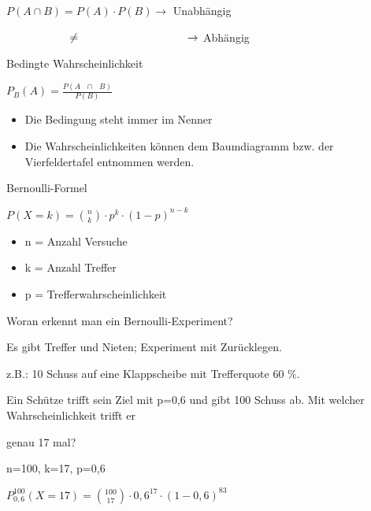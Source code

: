 \documentclass[paper=a6,landscape,ngerman,twoside=true,fontsize=12pt]{scrartcl}
\begin{document}
\begin{antwort}
	$P(A\cap B)=P(A)\cdot P(B) \rightarrow$ Unabhängig
	
	
	$\hspace{2cm}\neq \hspace{3.5cm}    \rightarrow$ Abhängig
\end{antwort}
\begin{frage}
	Bedingte Wahrscheinlichkeit
	
\end{frage}
\begin{antwort}
	\LARGE
	$P_B(A)=\frac{P(A \text{ }\cap \text{ }B)}{P(B)}$
	\large
	\begin{itemize}
		\item Die Bedingung steht immer im Nenner
		\item Die Wahrscheinlichkeiten können dem Baumdiagramm bzw. der Vierfeldertafel
		entnommen werden.
	\end{itemize}
	
	
\end{antwort}
\begin{frage}
	Bernoulli-Formel
	
\end{frage}
\begin{antwort}
	\LARGE
	$P(X=k)=\binom{n}{k} \cdot p^k \cdot (1-p)^{n-k}$
	\large
	\begin{itemize}
		\item n = Anzahl Versuche
		\item k = Anzahl Treffer
		\item p = Trefferwahrscheinlichkeit
	\end{itemize}	
\end{antwort}
\begin{frage}
	Woran erkennt man ein Bernoulli-Experiment?
	
\end{frage}
\begin{antwort}
	Es gibt Treffer und Nieten; Experiment mit Zurücklegen.
	
	z.B.: 10 Schuss auf eine Klappscheibe mit Trefferquote 60 $\%$.
\end{antwort}
\begin{frage}
	\large
	Ein Schütze trifft sein Ziel mit p=0,6 und gibt 100 Schuss ab. Mit welcher Wahrscheinlichkeit trifft er 
	
	\LARGE 
	genau 17 mal?
	
\end{frage}
\begin{antwort}
	n=100, k=17, p=0,6
	
	\bigskip
	$P^{100}_{0,6}(X=17)=\binom{100}{17} \cdot 0,6^{17} \cdot (1-0,6)^{83}$
	
\end{antwort}
\end{document}
